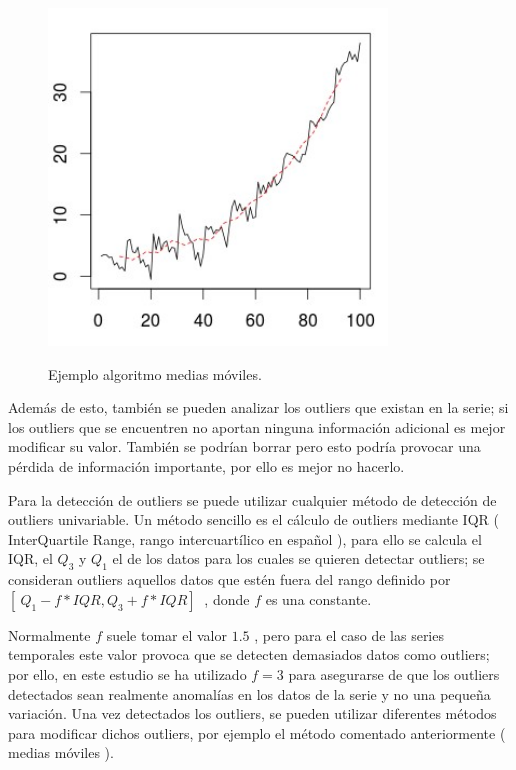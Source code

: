 \begin{figure}[h]
	\centering
	\includegraphics[width=90mm]{imagenes/moving_averages.png}
	\label{fig:11}
	\caption{Ejemplo algoritmo medias móviles.}
\end{figure}

Además de esto, también se pueden analizar los outliers que existan en la serie; si los outliers que se encuentren no aportan ninguna información adicional es mejor modificar su valor. También se podrían borrar pero esto podría provocar una pérdida de información importante, por ello es mejor no hacerlo.\newline

Para la detección de outliers se puede utilizar cualquier método de detección de outliers univariable. Un método sencillo es el cálculo de outliers mediante IQR ( InterQuartile Range, rango intercuartílico en español ), para ello se calcula el IQR, el $Q_3$ y $Q_1$ el  de los datos para los cuales se quieren detectar outliers; se consideran outliers aquellos datos que estén fuera del rango definido por $[\ Q_1 - f*IQR, Q_3+f*IQR ]\ $ , donde $f$ es una constante.\newline

Normalmente $f$ suele tomar el valor $1.5$ , pero para el caso de las series temporales este valor provoca que se detecten demasiados datos como outliers; por ello, en este estudio se ha utilizado $f=3$ para asegurarse de que los outliers detectados sean realmente anomalías en los datos de la serie y no una pequeña variación. Una vez detectados los outliers, se pueden utilizar diferentes métodos para modificar dichos outliers, por ejemplo el método comentado anteriormente ( medias móviles ).\newline

